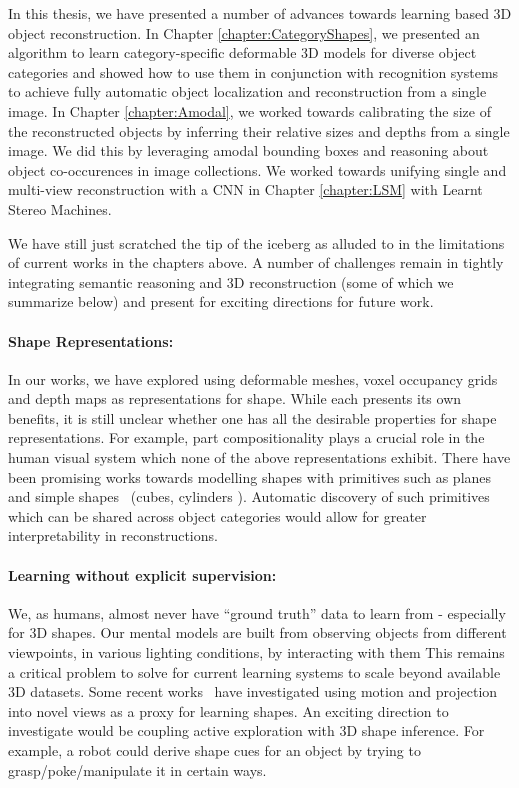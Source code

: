 \documentclass[../thesis.tex]{subfiles}
\begin{document}
In this thesis, we have presented a number of advances towards learning based 3D object reconstruction. In Chapter \ref{chapter:CategoryShapes}, we presented an algorithm to learn category-specific deformable 3D models for diverse object categories and showed how to use them in conjunction with recognition systems to achieve fully automatic object localization and reconstruction from a single image. In Chapter \ref{chapter:Amodal}, we worked towards calibrating the size of the reconstructed objects by inferring their relative sizes and depths from a single image. We did this by leveraging amodal bounding boxes and reasoning about object co-occurences in image collections. We worked towards unifying single and multi-view reconstruction with a CNN in Chapter \ref{chapter:LSM} with Learnt Stereo Machines.

We have still just scratched the tip of the iceberg as alluded to in the limitations of current works in the chapters above. A number of challenges remain in tightly integrating semantic reasoning and 3D reconstruction (some of which we summarize below) and present for exciting directions for future work. 

\paragraph{Shape Representations:} In our works, we have explored using deformable meshes, voxel occupancy grids and depth maps as representations for shape. While each presents its own benefits, it is still unclear whether one has all the desirable properties for shape representations. For example, part compositionality plays a crucial role in the human visual system which none of the above representations exhibit. There have been promising works towards modelling shapes with primitives such as planes and simple shapes~\cite{abstractionTulsiani17} (cubes, cylinders \etc). Automatic discovery of such primitives which can be shared across object categories would allow for greater interpretability in reconstructions.

\paragraph{Learning without explicit supervision:} We, as humans, almost never have ``ground truth'' data to learn from - especially for 3D shapes. Our mental models are built from observing objects from different viewpoints, in various lighting conditions, by interacting with them \etc This remains a critical problem to solve for current learning systems to scale beyond available 3D datasets. Some recent works~\cite{tulsiani2017multi,zhou2017unsupervised} have investigated using motion and projection into novel views as a proxy for learning shapes. An exciting direction to investigate would be coupling active exploration with 3D shape inference. For example, a robot could derive shape cues for an object by trying to grasp/poke/manipulate it in certain ways.
\end{document}

